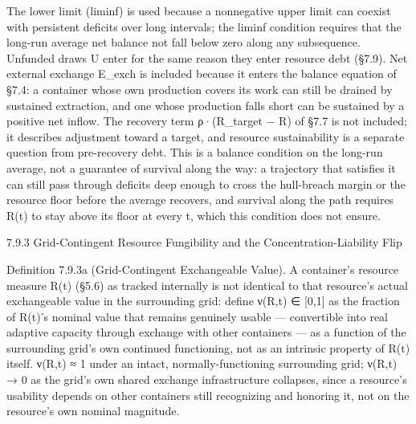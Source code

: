 \documentclass[
]{article}
\begin{document}
The lower limit (liminf) is used because a nonnegative upper limit can
coexist with persistent deficits over long intervals; the liminf
condition requires that the long-run average net balance not fall below
zero along any subsequence. Unfunded draws U enter for the same reason
they enter resource debt (§7.9). Net external exchange E\_exch is
included because it enters the balance equation of §7.4: a container
whose own production covers its work can still be drained by sustained
extraction, and one whose production falls short can be sustained by a
positive net inflow. The recovery term ρ·(R\_target − R) of §7.7 is not
included; it describes adjustment toward a target, and resource
sustainability is a separate question from pre-recovery debt. This is a
balance condition on the long-run average, not a guarantee of survival
along the way: a trajectory that satisfies it can still pass through
deficits deep enough to cross the hull-breach margin or the resource
floor before the average recovers, and survival along the path requires
R(t) to stay above its floor at every t, which this condition does not
ensure.

7.9.3 Grid-Contingent Resource Fungibility and the
Concentration-Liability Flip

Definition 7.9.3a (Grid-Contingent Exchangeable Value). A container's
resource measure R(t) (§5.6) as tracked internally is not identical to
that resource's actual exchangeable value in the surrounding grid:
define ν(R,t) ∈ {[}0,1{]} as the fraction of R(t)'s nominal value that
remains genuinely usable --- convertible into real adaptive capacity
through exchange with other containers --- as a function of the
surrounding grid's own continued functioning, not as an intrinsic
property of R(t) itself. ν(R,t) ≈ 1 under an intact,
normally-functioning surrounding grid; ν(R,t) → 0 as the grid's own
shared exchange infrastructure collapses, since a resource's usability
depends on other containers still recognizing and honoring it, not on
the resource's own nominal magnitude.
\end{document}
